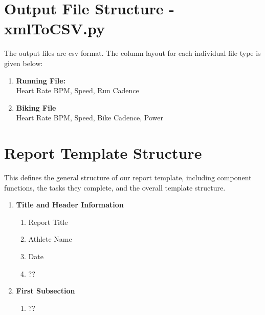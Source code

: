 \documentclass{article}
\begin{document}
\section*{Output File Structure - xmlToCSV.py} The output files are csv format. The column layout for each individual file type is given below:
\begin{enumerate}
	\item[]\textbf{Running File:} \\
		Heart Rate BPM, Speed, Run Cadence
	\item[]\textbf{Biking File} \\
		Heart Rate BPM, Speed, Bike Cadence, Power
\end{enumerate}

\section*{Report Template Structure}
This defines the general structure of our report template, including component functions, the tasks they complete, and the overall template structure.
\begin{enumerate}
	\item[]\textbf{Title and Header Information}
		\begin{enumerate}
			\item Report Title
			\item Athlete Name
			\item Date
			\item ??
		\end{enumerate}
	\item[]\textbf{First Subsection}
		\begin{enumerate}
			\item ??
		\end{enumerate}
\end{enumerate}
\end{document}
